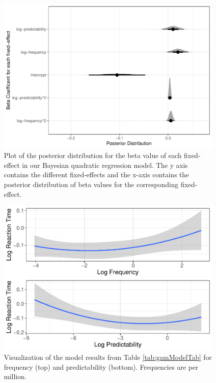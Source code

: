 \documentclass[
  man,floatsintext]{apa6}
\begin{document}
\begin{figure}

{\centering \includegraphics[width=0.8\linewidth]{write-up_files/figure-latex/posteriorplotFullQuadratic-1} 

}

\caption{Plot of the posterior distribution for the beta value of each fixed-effect in our Bayesian quadratic regression model. The y axis contains the different fixed-effects and the x-axis contains the posterior distribution of beta values for the corresponding fixed-effect.}\label{fig:posteriorplotFullQuadratic}
\end{figure}



\begin{figure}

{\centering \includegraphics[width=0.8\linewidth]{write-up_files/figure-latex/FullQuadraticPlot-1} 

}

\caption{Visualization of the model results from Table \ref{tab:gamModelTab} for frequency (top) and predictability (bottom). Frequencies are per million.}\label{fig:FullQuadraticPlot}
\end{figure}
\end{document}
